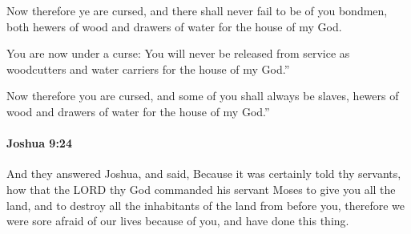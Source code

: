 			\begin{versebox}
					\item[BHS] 
					\item[ASV] Now therefore ye are cursed, and there shall never fail to be of you bondmen, both hewers of wood and drawers of water for the house of my God.
					\item[NIV] You are now under a curse: You will never be released from service as woodcutters and water carriers for the house of my God.”
					\item[NRSV] Now therefore you are cursed, and some of you shall always be slaves, hewers of wood and drawers of water for the house of my God.”
			\end{versebox}

		\paragraph{Joshua 9:24} %
			\label{JOSHUA-9-24}

			And they answered Joshua, and said, Because it was certainly told thy servants, how that the LORD thy God commanded his servant Moses to give you all the land, and to destroy all the inhabitants of the land from before you, therefore we were sore afraid of our lives because of you, and have done this thing.

